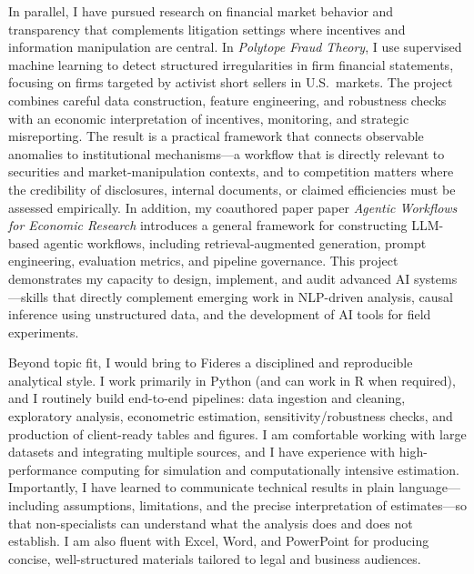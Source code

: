 \documentclass[11pt]{article}
\begin{document}
\vspace{0.2cm}

\noindent
In parallel, I have pursued research on financial market behavior and transparency that complements litigation settings where incentives and information manipulation are central. In \textit{Polytope Fraud Theory}, I use supervised machine learning to detect structured irregularities in firm financial statements, focusing on firms targeted by activist short sellers in U.S.\ markets. The project combines careful data construction, feature engineering, and robustness checks with an economic interpretation of incentives, monitoring, and strategic misreporting. The result is a practical framework that connects observable anomalies to institutional mechanisms---a workflow that is directly relevant to securities and market-manipulation contexts, and to competition matters where the credibility of disclosures, internal documents, or claimed efficiencies must be assessed empirically.
In addition, my coauthored paper paper \textit{Agentic Workflows for Economic Research} introduces a general framework for constructing LLM-based agentic workflows, including retrieval-augmented generation, prompt engineering, evaluation metrics, and pipeline governance. 
This project demonstrates my capacity to design, implement, and audit advanced AI systems—skills that directly complement emerging work in NLP-driven analysis, causal inference using unstructured data, and the development of AI tools for field experiments.

\vspace{0.2cm}

\noindent
Beyond topic fit, I would bring to Fideres a disciplined and reproducible analytical style. I work primarily in Python (and can work in R when required), and I routinely build end-to-end pipelines: data ingestion and cleaning, exploratory analysis, econometric estimation, sensitivity/robustness checks, and production of client-ready tables and figures. I am comfortable working with large datasets and integrating multiple sources, and I have experience with high-performance computing for simulation and computationally intensive estimation. Importantly, I have learned to communicate technical results in plain language---including assumptions, limitations, and the precise interpretation of estimates---so that non-specialists can understand what the analysis does and does not establish. I am also fluent with Excel, Word, and PowerPoint for producing concise, well-structured materials tailored to legal and business audiences.
\end{document}
